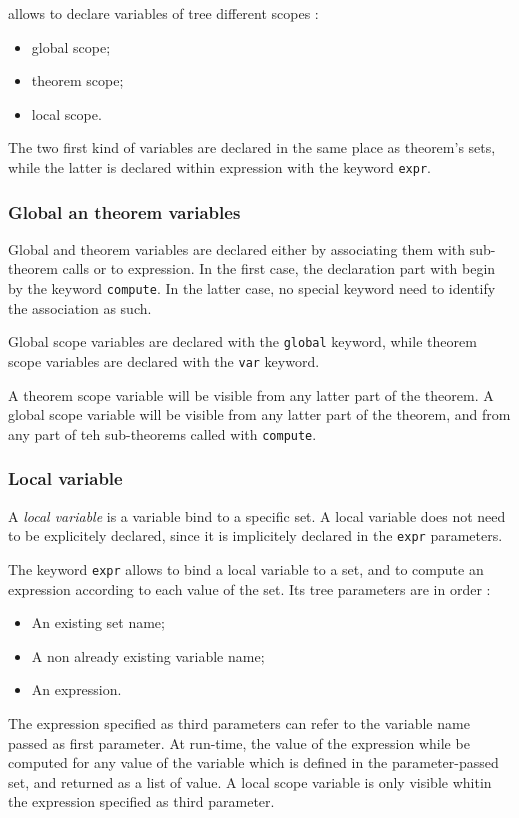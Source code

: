 \label {variable_def}

\real{} allows to declare variables of tree different scopes :
\begin {itemize}
\item global scope;
\item theorem scope;
\item local scope.
\end {itemize}
The two first kind of variables are declared in the same place as 
theorem's sets, while the latter is declared within expression with
the keyword \texttt{expr}.

\subsubsection {Global an theorem variables}

Global and theorem variables are declared either by associating them
with sub-theorem calls or to expression. In the first case, the 
declaration part with begin by the keyword \texttt{compute}. In the 
latter case, no special keyword need to identify the association as 
such.

Global scope variables are declared with the \texttt{global} keyword, 
while theorem scope variables are declared with the \texttt{var} 
keyword.

A theorem scope variable will be visible from any latter part of the 
theorem. A global scope variable will be visible from any latter part 
of the theorem, and from any part of teh sub-theorems called with 
\texttt{compute}.

\subsubsection {Local variable}

A \textit{local variable} is a variable bind to a specific set. A 
local variable does not need to be explicitely declared, since it is
implicitely declared in the \texttt{expr} parameters.

The keyword \texttt{expr} allows to bind a local variable to a set, 
and to compute an expression according to each value of the set.
Its tree parameters are in order :
\begin {itemize}
\item An existing set name;
\item A non already existing variable name;
\item An expression.
\end {itemize}
The expression specified as third parameters can refer to the variable
name passed as first parameter. At run-time, the value of the expression
while be computed for any value of the variable which is defined in the 
parameter-passed set, and returned as a list of value. A local scope 
variable is only visible whitin the expression specified as third 
parameter. 